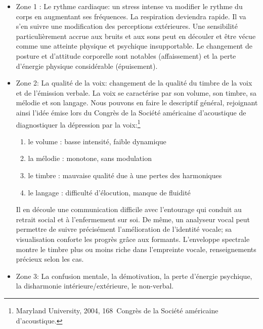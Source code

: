 \begin{itemize}
  	\item Zone 1 :  Le rythme cardiaque: un stress intense va modifier le rythme
  du corps en augmentant ses fréquences. La respiration deviendra
  rapide. Il va s'en suivre une modification des perceptions
  extérieures. Une sensibilité particulièrement accrue aux bruits et
  aux sons peut en découler et être vécue comme une
  atteinte physique et psychique insupportable.
  Le changement de posture et d'attitude corporelle sont
notables (affaissement) et la perte d'énergie physique considérable (épuisement).
	\item Zone 2: La qualité de la voix: changement de la qualité du timbre de la
 voix et de l'émission verbale.
  La voix se caractérise par son volume, son timbre, sa mélodie et son
  langage. Nous pouvons en faire le
        descriptif général, rejoignant ainsi l'idée émise lors du Congrès de la Société
        américaine d'acoustique \autocite{le_service_metronews}
        de diagnostiquer la
        dépression par la voix:\footnote{Maryland University, 2004, 168\ieme\ Congrès de la Société
américaine d'acoustique.}

 	\begin{enumerate}
 		\item le volume : basse intensité, faible dynamique
 		\item la mélodie : monotone, sans modulation
 		\item le timbre : mauvaise qualité due à une pertes des harmoniques
 		\item le langage : difficulté d'élocution, manque de fluidité
 	\end{enumerate}
        Il en découle une communication difficile avec l'entourage qui
        conduit au retrait social et à l'enfermement sur soi.
De même, un analyseur vocal peut permettre de suivre précisément l'amélioration de
l'identité vocale; sa visualisation conforte les progrès grâce aux
formants. L'enveloppe spectrale montre le timbre plus ou moins riche
dans l'empreinte vocale, renseignements précieux selon les cas.

	\item Zone 3: La confusion mentale, la démotivation, la perte d'énergie
psychique, la disharmonie intérieure/extérieure, le non-verbal.
\end{itemize}



